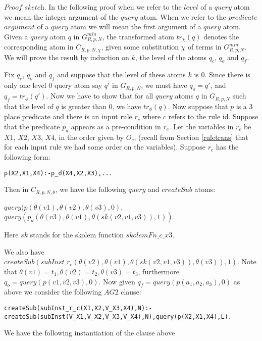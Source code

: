 $\textit{Proof sketch}$. In the following proof when we refer to the $level$ of a $query$ atom we mean the integer argument of the $query$ atom. When we refer to the $predicate$ $argument$ of a $query$ atom we will mean the first argument of a $query$ atom. Given a $query$ atom $q$ in $G_{R,p,N}^{min}$, the transformed atom $tr_{\chi}(q)$ denotes the corresponding atom in $C_{R,p,N,\chi}$, given some substitution $\chi$ of terms in $G_{R,p,N}^{min}$. We will prove the result by induction on $k$, the level of the atoms $q_{c}$, $q_{o}$ and $q_{f}$. 

Fix $q_{c}$, $q_{o}$ and $q_{f}$ and suppose that the level of these atoms $k$ is $0$. Since there is only one level $0$ query atom say $q'$ in $G_{R,p,N}$, we must have $q_{o}=q'$, and $q_{f} = tr_{\phi}(q')$. Now we have to show that for all $query$ atoms $q$ in $G_{R,p,N}$ such that the level of $q$ is greater than $0$, we have $tr_{\phi}(q)$. Now suppose that $p$ is a 3 place predicate and there is an input rule $r_{c}$ where ${c}$ refers to the rule id. Suppose that the predicate $p_{d}$ appears as a pre-condition in $r_{c}$. Let the variables in $r_{c}$ be $X1$, $X2$, $X3$, $X4$, in the order given by $O_{c}$, (recall from Section \ref{ruletrans} that for each input rule we had some order on the variables). Suppose $r_{c}$ has the following form:
\begin{verbatim}
p(X2,X1,X4):-p_d(X4,X2,X3),...    
\end{verbatim}

Then in $C_{R,p,N,\theta}$, we have the following $query$ and $createSub$ atoms:

$query(p(\theta(v1),\theta(v2),\theta(v3),0)$,\\ $query(p_{d}(\theta(v3),\theta(v1),\theta(sk(v2,v1,v3)),1))$. 

Here $sk$ stands for the skolem function $skolemFn\_c\_x3$. 

We also have\\
$createSub(subInst\_r_{c}(\theta(v2),\theta(v1),\theta(sk(v2,v1,v3)), \theta(v3)),1)$. Note that $\theta(v1)=t_{1},\theta(v2)=t_{2},\theta(v3)=t_{3}$, furthermore\\ $q_{o}= query(p(v1,v2,v3),0)$. Now given $q_{f} = query(p(a_{1},a_{2},a_{3}),0)$ as above we consider the following $AG2$ clause:
\begin{lstlisting}[frame=none]
createSub(subInst_r_c(X1,X2,V_X3,X4),N):-
createSub(subInst(V_X1,V_X2,V_X3,V_X4),N),query(p(X2,X1,X4),L).    
\end{lstlisting}
We have the following instantiation of the clause above

